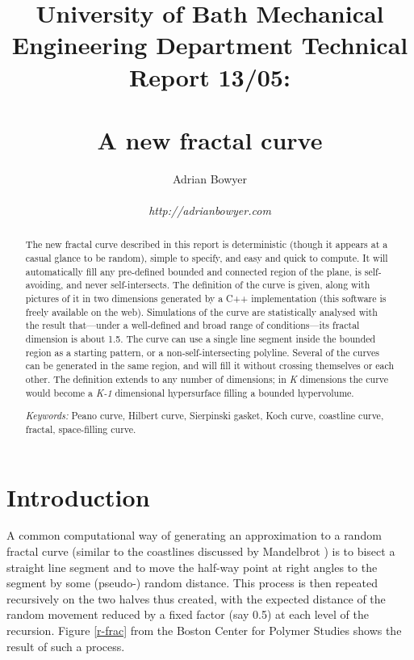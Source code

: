 \documentclass[12pt]{article}
\title{{\Large University of Bath Mechanical Engineering Department 
Technical Report 13/05:}\\~\\{\LARGE A new fractal curve}}
\author{Adrian Bowyer\\
\\
{\em http://adrianbowyer.com}}
\date{\displaydate{date}}
\begin{document}
 

 
\maketitle
 
\begin{abstract}

\noindent
The new fractal curve described in this report is deterministic
(though it appears at a casual glance to be random), simple to
specify, and easy and quick to compute.  It will automatically fill
any pre-defined bounded and connected region of the plane, is
self-avoiding, and never self-intersects.  The definition of the curve
is given, along with pictures of it in two dimensions generated by a
C++ implementation (this software is freely available on the web).
Simulations of the curve are statistically analysed with the result
that---under a well-defined and broad range of conditions---its
fractal dimension is about 1.5.  The curve can use a single line
segment inside the bounded region as a starting pattern, or a
non-self-intersecting polyline.  Several of the curves can be
generated in the same region, and will fill it without crossing
themselves or each other.  The definition extends to any number of
dimensions; in {\em K} dimensions the curve would become a {\em K-1}
dimensional hypersurface filling a bounded hypervolume.

\vspace{3mm}
                                                             
\noindent
{\em Keywords:} Peano curve, Hilbert curve, Sierpinski gasket, Koch
curve, coastline curve, fractal, space-filling curve.

\end{abstract}

 
\section*{Introduction}

A common computational way of generating an approximation to a random
fractal curve (similar to the coastlines discussed by Mandelbrot
\cite{mandelbrot}) is to bisect a straight line segment and to move
the half-way point at right angles to the segment by some (pseudo-)
random distance.  This process is then repeated recursively on the two
halves thus created, with the expected distance of the random movement
reduced by a fixed factor (say 0.5) at each level of the recursion.
Figure \ref{r-frac} from the Boston Center for Polymer Studies
\cite{boston-cps} shows the result of such a process.
\end{document}
